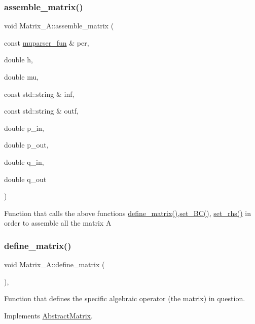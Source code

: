 \subsubsection{\texorpdfstring{assemble\+\_\+matrix()}{assemble\_matrix()}}
{\footnotesize\ttfamily void Matrix\+\_\+\+A\+::assemble\+\_\+matrix (\begin{DoxyParamCaption}\item[{const \hyperlink{classmuparser__fun}{muparser\+\_\+fun} \&}]{per,  }\item[{double}]{h,  }\item[{double}]{mu,  }\item[{const std\+::string \&}]{inf,  }\item[{const std\+::string \&}]{outf,  }\item[{double}]{p\+\_\+in,  }\item[{double}]{p\+\_\+out,  }\item[{double}]{q\+\_\+in,  }\item[{double}]{q\+\_\+out }\end{DoxyParamCaption})}

Function that calls the above functions \hyperlink{classMatrix__A_aabd70de6bdf8e08a0a71c81b4c37554f}{define\+\_\+matrix()},\hyperlink{classMatrix__A_aa6830348870aa5b7c6e99fb65dcb6b6e}{set\+\_\+\+B\+C()}, \hyperlink{classMatrix__A_a750e028c607aa3e4ac59db450aa43d2a}{set\+\_\+rhs()} in order to assemble all the matrix A \mbox{\label{classMatrix__A_aabd70de6bdf8e08a0a71c81b4c37554f}} 
\subsubsection{\texorpdfstring{define\+\_\+matrix()}{define\_matrix()}}
{\footnotesize\ttfamily void Matrix\+\_\+\+A\+::define\+\_\+matrix (\begin{DoxyParamCaption}{ }\end{DoxyParamCaption})\hspace{0.3cm}{\ttfamily [override]}, {\ttfamily [virtual]}}

Function that defines the specific algebraic operator (the matrix) in question. 

Implements \hyperlink{classAbstractMatrix_a40016da151226fbfcd444839943d8fe3}{Abstract\+Matrix}.

\mbox{\label{classMatrix__A_aa6830348870aa5b7c6e99fb65dcb6b6e}} 
